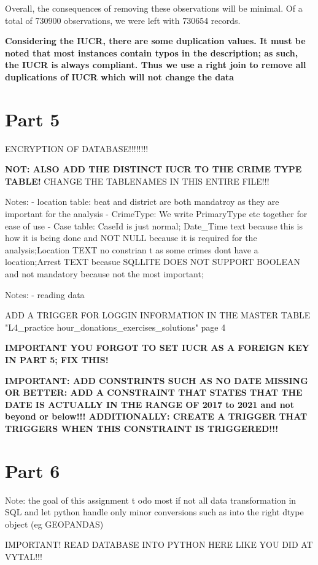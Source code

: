 \documentclass[a4paper]{article}
\begin{document}
Overall, the consequences of removing these observations will be minimal. Of a total of 730900 observations, we were left with 730654 records. 


\textbf{Considering the IUCR, there are some duplication values. It must be noted that most instances contain typos in the description; as such, the IUCR is always compliant. Thus we use a right join to remove all duplications of IUCR which will not change the data}

\section{Part 5}
ENCRYPTION OF DATABASE!!!!!!!!

\textbf{NOT: ALSO ADD THE DISTINCT IUCR TO THE CRIME TYPE TABLE!}
CHANGE THE TABLENAMES IN THIS ENTIRE FILE!!! 

Notes:
- location table: beat and district are both mandatroy as they are important for the analysis
- CrimeType: We write PrimaryType etc together for ease of use
- Case table: CaseId is just normal; Date_Time text because this is how it is being done and NOT NULL because it is required for the analysis;Location TEXT no constrian t as some crimes dont have a location;Arrest TEXT becasue SQLLITE DOES NOT SUPPORT BOOLEAN and not mandatory because not the most important;

Notes:
- reading data

ADD A TRIGGER FOR LOGGIN INFORMATION IN THE MASTER TABLE "L4_practice hour_donations_exercises_solutions" page 4

\textbf{IMPORTANT YOU FORGOT TO SET IUCR AS A FOREIGN KEY IN PART 5; FIX THIS!}

\textbf{IMPORTANT: ADD CONSTRINTS SUCH AS NO DATE MISSING OR BETTER: ADD A CONSTRAINT THAT STATES THAT THE DATE IS ACTUALLY IN THE RANGE OF 2017 to 2021 and not beyond or below!!! ADDITIONALLY: CREATE A TRIGGER THAT TRIGGERS WHEN THIS CONSTRAINT IS TRIGGERED!!!}



\section{Part 6}

Note: the goal of this assignment t odo most if not all data transformation in SQL and let python handle only minor conversions such as into the right dtype object (eg GEOPANDAS)

IMPORTANT! READ DATABASE INTO PYTHON HERE LIKE YOU DID AT VYTAL!!!
\end{document}
